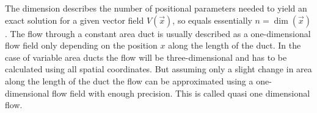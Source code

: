 	The dimension describes the number of positional parameters needed to yield an exact solution for a given vector field $V(\vec{x})$, so equals essentially $n = \dim(\vec{x})$. 
	The flow through a constant area duct is usually described as a one-dimensional flow field only depending on the position $x$ along the length of the duct.
	In the case of variable area ducts the flow will be three-dimensional and has to be calculated using all spatial coordinates.
	But assuming only a slight change in area along the length of the duct the flow can be approximated using a one-dimensional flow field with enough precision.
	This is called quasi one dimensional flow. \cite{anderson2021modern}
